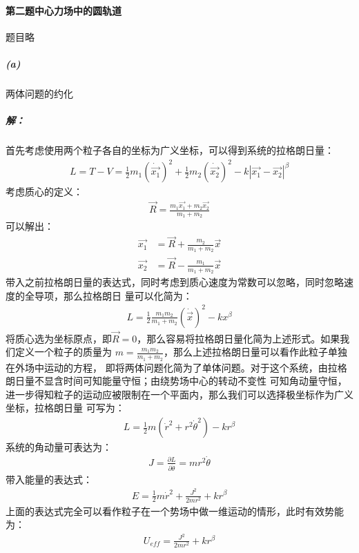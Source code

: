 \documentclass[a4paper]{ctexart}
\begin{document}
    \paragraph{第二题\;\;中心力场中的圆轨道}题目略
    \subparagraph{(a)}两体问题的约化
    \subparagraph{解：}
    首先考虑使用两个粒子各自的坐标为广义坐标，可以得到系统的拉格朗日量：
    \begin{align}
        L = T - V = \frac{1}{2}m_{1}(\dot{\vec{x_{1}}})^{2} + \frac{1}{2}m_{2}(\dot{\vec{x_{2}}})^{2} - k|\vec{x_{1}} - \vec{x_{2}}|^{\beta}
    \end{align}
    考虑质心的定义：
    \begin{align}
        \vec{R} = \frac{m_{1}\vec{x_{1}} + m_{2}\vec{x_{2}}}{m_{1} + m_{2}}
    \end{align}
    可以解出：
    \begin{align}
        \vec{x_{1}} &= \vec{R} + \frac{m_{2}}{m_{1} + m_{2}}\vec{x}\\
        \vec{x_{2}} &= \vec{R} - \frac{m_{1}}{m_{1} + m_{2}}\vec{x}
    \end{align}
    带入之前拉格朗日量的表达式，同时考虑到质心速度为常数可以忽略，同时忽略速度的全导项，那么拉格朗日
    量可以化简为：
    \begin{align}
        L = \frac{1}{2}\frac{m_{1}m_{2}}{m_{1} + m_{2}}(\dot{\vec{x}})^{2} - kx^{\beta}
    \end{align}
    将质心选为坐标原点，即$\vec{R}=0$，那么容易将拉格朗日量化简为上述形式。如果我们定义一个粒子的质量为
    $m = \frac{m_{1}m_{2}}{m_{1} + m_{2}}$，那么上述拉格朗日量可以看作此粒子单独在外场中运动的方程，
    即将两体问题化简为了单体问题。对于这个系统，由拉格朗日量不显含时间可知能量守恒；由绕势场中心的转动不变性
    可知角动量守恒，进一步得知粒子的运动应被限制在一个平面内，那么我们可以选择极坐标作为广义坐标，拉格朗日量
    可写为：
    \begin{align}
        L = \frac{1}{2}m(\dot{r}^{2} + r^{2}\dot{\theta}^{2}) - kr^{\beta}
    \end{align}
    系统的角动量可表达为：
    \begin{align}
        J = \frac{\partial L}{\partial \dot{\theta}} = mr^{2}\dot{\theta}
    \end{align}
    带入能量的表达式：
    \begin{align}
        E = \frac{1}{2}m\dot{r}^{2} + \frac{J^{2}}{2mr^{2}} + kr^{\beta}
    \end{align}
    上面的表达式完全可以看作粒子在一个势场中做一维运动的情形，此时有效势能为：
    \begin{align}
        U_{eff} = \frac{J^{2}}{2mr^{2}} + kr^{\beta}
    \end{align}
\end{document}
